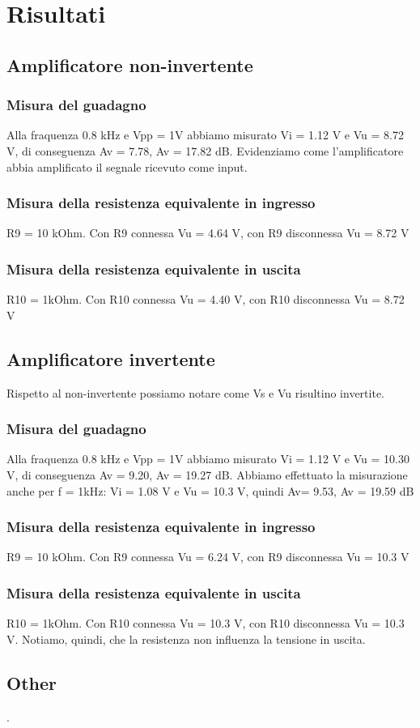 \documentclass[a4paper]{article}
\begin{document}
	\section{Risultati}
		\subsection{Amplificatore non-invertente}
			
			\subsubsection{Misura del guadagno}
				Alla fraquenza 0.8 kHz e Vpp = 1V abbiamo misurato Vi = 1.12 V e Vu = 8.72 V, di conseguenza Av = 7.78, Av = 17.82 dB. 
				Evidenziamo come l'amplificatore abbia amplificato il segnale ricevuto come input.
			\subsubsection{Misura della resistenza equivalente in ingresso}	
				R9 = 10 kOhm.
				Con R9 connessa Vu = 4.64 V, con R9 disconnessa Vu = 8.72 V
			\subsubsection{Misura della resistenza equivalente in uscita}
				R10 = 1kOhm.
				Con R10 connessa Vu = 4.40 V, con R10 disconnessa Vu = 8.72 V
				
				
		\subsection{Amplificatore invertente}
			Rispetto al non-invertente possiamo notare come Vs e Vu risultino invertite. 
			\subsubsection{Misura del guadagno}
			Alla fraquenza 0.8 kHz e Vpp = 1V abbiamo misurato Vi = 1.12 V e Vu = 10.30 V, di conseguenza Av = 9.20, Av = 19.27 dB. 
			Abbiamo effettuato la misurazione anche per f = 1kHz:
			Vi = 1.08 V e Vu = 10.3 V, quindi Av= 9.53, Av = 19.59 dB
			\subsubsection{Misura della resistenza equivalente in ingresso}	
				R9 = 10 kOhm.
				Con R9 connessa Vu = 6.24 V, con R9 disconnessa Vu = 10.3 V
			\subsubsection{Misura della resistenza equivalente in uscita}	
				R10 = 1kOhm.
				Con R10 connessa Vu = 10.3 V, con R10 disconnessa Vu = 10.3 V.
				Notiamo, quindi, che la resistenza non influenza la tensione in uscita.
		\subsection{Other}
			.
\end{document}
